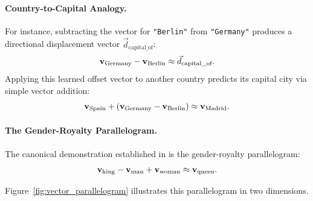 \documentclass[../../main.tex]{subfiles}
\begin{document}
\paragraph{Country-to-Capital Analogy.}
For instance, subtracting the vector for \texttt{"Berlin"} from \texttt{"Germany"} produces a directional displacement vector $\vec{d}_{\text{capital\_of}}$:
\begin{equation}
\label{eq:rel_germany_berlin}
\mathbf{v}_{\text{Germany}} - \mathbf{v}_{\text{Berlin}} \approx \vec{d}_{\text{capital\_of}}.
\end{equation}
Applying this learned offset vector to another country predicts its capital city via simple vector addition:
\begin{equation}
\label{eq:rel_spain_madrid}
\mathbf{v}_{\text{Spain}} + (\mathbf{v}_{\text{Germany}} - \mathbf{v}_{\text{Berlin}}) \approx \mathbf{v}_{\text{Madrid}}.
\end{equation}

\paragraph{The Gender-Royalty Parallelogram.}
The canonical demonstration established in \cite{mikolov2013distributed} is the gender-royalty parallelogram:
\begin{equation}
\label{eq:king_queen_arithmetic}
\mathbf{v}_{\text{king}} - \mathbf{v}_{\text{man}} + \mathbf{v}_{\text{woman}} \approx \mathbf{v}_{\text{queen}}.
\end{equation}

Figure~\ref{fig:vector_parallelogram} illustrates this parallelogram in two dimensions.
\end{document}
